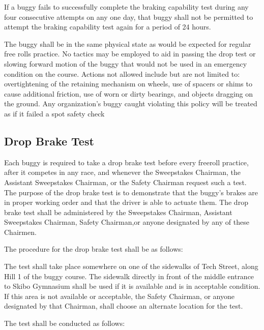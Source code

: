 	If a buggy fails to successfully complete the braking capability test during
	any four consecutive attempts on any one day, that buggy shall not be permitted
	to attempt the braking capability test again for a period of 24 hours.

	The buggy shall be in the same physical state as would be expected for regular
	free rolls practice. No tactics may be employed to aid in passing the drop test
	or slowing forward motion of the buggy that would not be used in an emergency
	condition on the course. Actions not allowed include but are not limited to:
	overtightening of the retaining mechanism on wheels, use of spacers or shims to
	cause additional friction, use of worn or dirty bearings, and objects dragging
	on the ground. Any organization's buggy caught violating this policy will be
	treated as if it failed a spot safety check

\subsection{Drop Brake Test}

	Each buggy is required to take a drop brake test before every freeroll
	practice, after it competes in any race, and whenever the Sweepstakes Chairman,
	the Assistant Sweepstakes Chairman, or the Safety Chairman request such a test.
	The purpose of the drop brake test is to demonstrate that the buggy's brakes
	are in proper working order and that the driver is able to actuate them. The
	drop brake test shall be administered by the Sweepstakes Chairman, Assistant
	Sweepstakes Chairman, Safety Chairman,or anyone designated by any of these
	Chairmen.
	\newline

	\noindent The procedure for the drop brake test shall be as follows:

	The test shall take place somewhere on one of the sidewalks of Tech Street,
	along Hill 1 of the buggy course. The sidewalk directly in front of the middle
	entrance to Skibo Gymnasium shall be used if it is available and is in
	acceptable condition. If this area is not available or acceptable, the Safety
	Chairman, or anyone designated by that Chairman, shall choose an alternate
	location for the test.
	\newline

	\noindent The test shall be conducted as follows:

